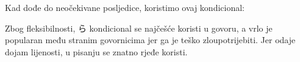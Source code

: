 	Kad dođe do neočekivane posljedice, koristimo ovaj kondicional:
	
	\begin{reibun}
	\end{reibun}

	Zbog fleksibilnosti, ら kondicional se najčešće koristi u govoru, a vrlo je popularan među stranim govornicima jer ga je teško zloupotrijebiti. Jer odaje dojam lijenosti, u pisanju se znatno rjeđe koristi.
	
